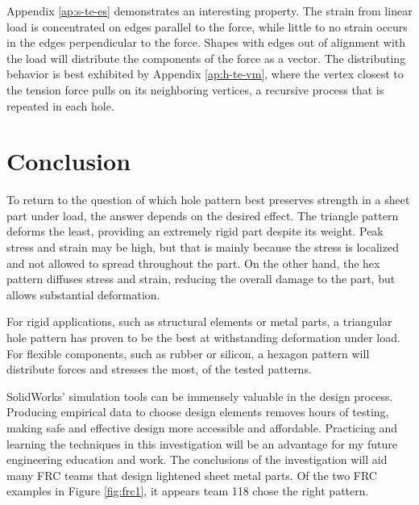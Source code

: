 \documentclass[12pt, letterpaper]{article}
\begin{document}
Appendix \ref{ap:s-te-es} demonstrates an interesting property. The strain from linear load is concentrated on edges parallel to the force, while little to no strain occurs in the edges perpendicular to the force. Shapes with edges out of alignment with the load will distribute the components of the force as a vector. The distributing behavior is best exhibited by Appendix \ref{ap:h-te-vm}, where the vertex closest to the tension force pulls on its neighboring vertices, a recursive process that is repeated in each hole. 

\section{Conclusion}
\label{sec:conclusion}

To return to the question of which hole pattern best preserves strength in a sheet part under load, the answer depends on the desired effect. The triangle pattern deforms the least, providing an extremely rigid part despite its weight. Peak stress and strain may be high, but that is mainly because the stress is localized and not allowed to spread throughout the part. On the other hand, the hex pattern diffuses stress and strain, reducing the overall damage to the part, but allows substantial deformation. 

For rigid applications, such as structural elements or metal parts, a triangular hole pattern has proven to be the best at withstanding deformation under load. For flexible components, such as rubber or silicon, a hexagon pattern will distribute forces and stresses the most, of the tested patterns. 

SolidWorks' simulation tools can be immensely valuable in the design process. Producing empirical data to choose design elements removes hours of testing, making safe and effective design more accessible and affordable. Practicing and learning the techniques in this investigation will be an advantage for my future engineering education and work. The conclusions of the investigation will aid many FRC teams that design lightened sheet metal parts. Of the two FRC examples in Figure \ref{fig:frc1}, it appears team 118 chose the right pattern. 

\newpage
\printbibliography{}

\newpage
\appendix
{}
\appendixpage
\addappheadtotoc
\listoffigures
\end{document}
